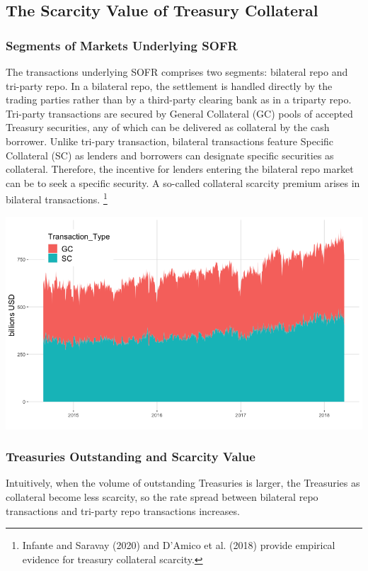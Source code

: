 \documentclass[12pt]{article}
\begin{document}
\newpage
\subsection{The Scarcity Value of Treasury Collateral}
\subsubsection{Segments of Markets Underlying SOFR}
The transactions underlying SOFR comprises two segments: bilateral repo and tri-party repo. In a bilateral repo, the settlement is handled directly by the trading parties rather than by a third-party clearing bank as in a triparty repo. Tri-party transactions are secured by General Collateral (GC) pools of accepted Treasury securities, any of which can be delivered as collateral by the cash borrower.  Unlike tri-pary transaction,  bilateral transactions feature Specific Collateral (SC) as lenders and borrowers can designate specific securities as collateral.  Therefore,  the incentive for lenders entering the bilateral repo market can be to seek a specific security.  A so-called collateral scarcity premium arises in bilateral transactions. \footnote{Infante and Saravay (2020) and D’Amico et al.  (2018) provide empirical evidence for treasury collateral scarcity.} \\
\begin{center}
\includegraphics[scale=.5]{fig1.png}
\end{center}


\subsubsection{Treasuries Outstanding and Scarcity Value}
Intuitively,  when the volume of outstanding Treasuries is larger,  the Treasuries as collateral become less scarcity,  so the rate spread between bilateral repo transactions and tri-party repo transactions increases.  
\end{document}
